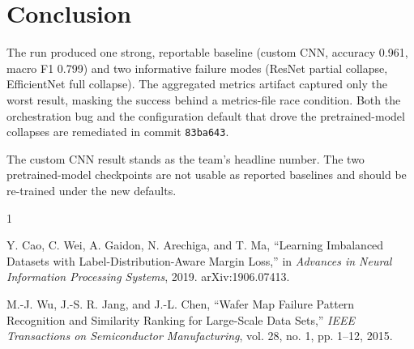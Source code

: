 \documentclass[conference]{IEEEtran}
\begin{document}
\section{Conclusion}

The run produced one strong, reportable baseline (custom CNN, accuracy
0.961, macro F1 0.799) and two informative failure modes (ResNet partial
collapse, EfficientNet full collapse). The aggregated metrics artifact
captured only the worst result, masking the success behind a
metrics-file race condition. Both the orchestration bug and the
configuration default that drove the pretrained-model collapses are
remediated in commit \texttt{83ba643}.

The custom CNN result stands as the team's headline number. The two
pretrained-model checkpoints are not usable as reported baselines and
should be re-trained under the new defaults.

\begin{thebibliography}{1}

Y. Cao, C. Wei, A. Gaidon, N. Arechiga, and T. Ma,
``Learning Imbalanced Datasets with Label-Distribution-Aware Margin Loss,''
in \emph{Advances in Neural Information Processing Systems}, 2019.
arXiv:1906.07413.

M.-J. Wu, J.-S. R. Jang, and J.-L. Chen,
``Wafer Map Failure Pattern Recognition and Similarity Ranking for
Large-Scale Data Sets,''
\emph{IEEE Transactions on Semiconductor Manufacturing},
vol. 28, no. 1, pp. 1--12, 2015.

\end{thebibliography}
\end{document}
